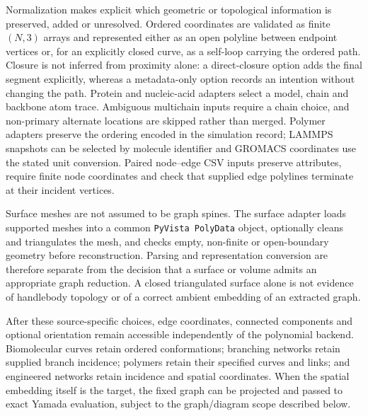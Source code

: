 \documentclass[10pt,twocolumn]{article}
\begin{document}
Normalization makes explicit which geometric or topological information is preserved, added or unresolved. Ordered coordinates are validated as finite $(N,3)$ arrays and represented either as an open polyline between endpoint vertices or, for an explicitly closed curve, as a self-loop carrying the ordered path. Closure is not inferred from proximity alone: a direct-closure option adds the final segment explicitly, whereas a metadata-only option records an intention without changing the path. Protein and nucleic-acid adapters select a model, chain and backbone atom trace. Ambiguous multichain inputs require a chain choice, and non-primary alternate locations are skipped rather than merged. Polymer adapters preserve the ordering encoded in the simulation record; LAMMPS snapshots can be selected by molecule identifier and GROMACS coordinates use the stated unit conversion. Paired node--edge CSV inputs preserve attributes, require finite node coordinates and check that supplied edge polylines terminate at their incident vertices.

Surface meshes are not assumed to be graph spines. The surface adapter loads supported meshes into a common \texttt{PyVista PolyData} object, optionally cleans and triangulates the mesh, and checks empty, non-finite or open-boundary geometry before reconstruction. Parsing and representation conversion are therefore separate from the decision that a surface or volume admits an appropriate graph reduction. A closed triangulated surface alone is not evidence of handlebody topology or of a correct ambient embedding of an extracted graph.

After these source-specific choices, edge coordinates, connected components and optional orientation remain accessible independently of the polynomial backend. Biomolecular curves retain ordered conformations; branching networks retain supplied branch incidence; polymers retain their specified curves and links; and engineered networks retain incidence and spatial coordinates. When the spatial embedding itself is the target, the fixed graph can be projected and passed to exact Yamada evaluation, subject to the graph/diagram scope described below.
\end{document}
